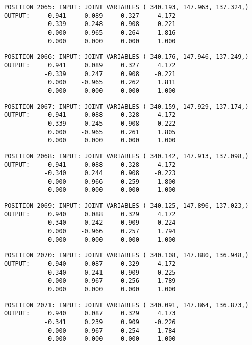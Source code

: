 \begin{verbatim}
POSITION 2065: INPUT: JOINT VARIABLES ( 340.193, 147.963, 137.324,)
OUTPUT:     0.941     0.089     0.327     4.172
           -0.339     0.248     0.908    -0.221
            0.000    -0.965     0.264     1.816
            0.000     0.000     0.000     1.000
\end{verbatim} \pagebreak[1]\begin{verbatim}
POSITION 2066: INPUT: JOINT VARIABLES ( 340.176, 147.946, 137.249,)
OUTPUT:     0.941     0.089     0.327     4.172
           -0.339     0.247     0.908    -0.221
            0.000    -0.965     0.262     1.811
            0.000     0.000     0.000     1.000
\end{verbatim} \pagebreak[1]\begin{verbatim}
POSITION 2067: INPUT: JOINT VARIABLES ( 340.159, 147.929, 137.174,)
OUTPUT:     0.941     0.088     0.328     4.172
           -0.339     0.245     0.908    -0.222
            0.000    -0.965     0.261     1.805
            0.000     0.000     0.000     1.000
\end{verbatim} \pagebreak[1]\begin{verbatim}
POSITION 2068: INPUT: JOINT VARIABLES ( 340.142, 147.913, 137.098,)
OUTPUT:     0.941     0.088     0.328     4.172
           -0.340     0.244     0.908    -0.223
            0.000    -0.966     0.259     1.800
            0.000     0.000     0.000     1.000
\end{verbatim} \pagebreak[1]\begin{verbatim}
POSITION 2069: INPUT: JOINT VARIABLES ( 340.125, 147.896, 137.023,)
OUTPUT:     0.940     0.088     0.329     4.172
           -0.340     0.242     0.909    -0.224
            0.000    -0.966     0.257     1.794
            0.000     0.000     0.000     1.000
\end{verbatim} \pagebreak[1]\begin{verbatim}
POSITION 2070: INPUT: JOINT VARIABLES ( 340.108, 147.880, 136.948,)
OUTPUT:     0.940     0.087     0.329     4.172
           -0.340     0.241     0.909    -0.225
            0.000    -0.967     0.256     1.789
            0.000     0.000     0.000     1.000
\end{verbatim} \pagebreak[1]\begin{verbatim}
POSITION 2071: INPUT: JOINT VARIABLES ( 340.091, 147.864, 136.873,)
OUTPUT:     0.940     0.087     0.329     4.173
           -0.341     0.239     0.909    -0.226
            0.000    -0.967     0.254     1.784
            0.000     0.000     0.000     1.000
\end{verbatim} \pagebreak[1]\begin{verbatim}

\end{verbatim}
